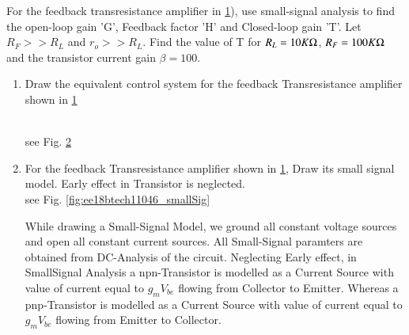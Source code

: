 For the feedback transresistance amplifier in \ref{fig:ee18btech11046_Question}), use small-signal analysis to find the open-loop gain 'G', Feedback factor 'H' and Closed-loop gain 'T'. Let $R_{F}>>R_{L}$ and $r_{o}>>R_{L}$. Find the value of T for $R_{L}=10K\ohm$, $R_{F}=100K\ohm$ and the transistor current gain $\beta = 100$.
\begin{enumerate}[label=\arabic*.,ref=\theenumi]
\item Draw the equivalent control system for the feedback Transresistance amplifier shown in \ref{fig:ee18btech11046_Question}
\renewcommand{\thefigure}{\theenumi.\arabic{figure}}
\begin{figure}[h!]
	\begin{center}
		\resizebox{\columnwidth/1}{!}{}
	\end{center}
	\caption{}
	\label{fig:ee18btech11046_Question}
\end{figure}
\\

%
\solution see Fig. \ref{fig:ee18btech11046_ControlSystem}
\begin{figure}[ht!]
	\begin{center}
		\resizebox{\columnwidth}{!}{}
	\end{center}
	\caption{}
	\label{fig:ee18btech11046_ControlSystem}
\end{figure}
\renewcommand{\thefigure}{\theenumi}

%
\item For the feedback Transresistance amplifier shown in \ref{fig:ee18btech11046_Question}, Draw its small signal model. Early effect in Transistor is neglected.
\\
%
\solution see Fig. \ref {fig:ee18btech11046_smallSig}

While drawing a Small-Signal Model, we
ground all constant voltage sources and open
all constant current sources. All Small-Signal
paramters are obtained from DC-Analysis of
the circuit. Neglecting Early effect, in SmallSignal Analysis a npn-Transistor is modelled as
a Current Source with value of current equal to
$g_{m}V_{be}$ flowing from Collector to Emitter. Whereas
a pnp-Transistor is modelled as a Current Source
with value of current equal to $g_{m}V_{be}$ flowing
from Emitter to Collector.


\end{enumerate}
